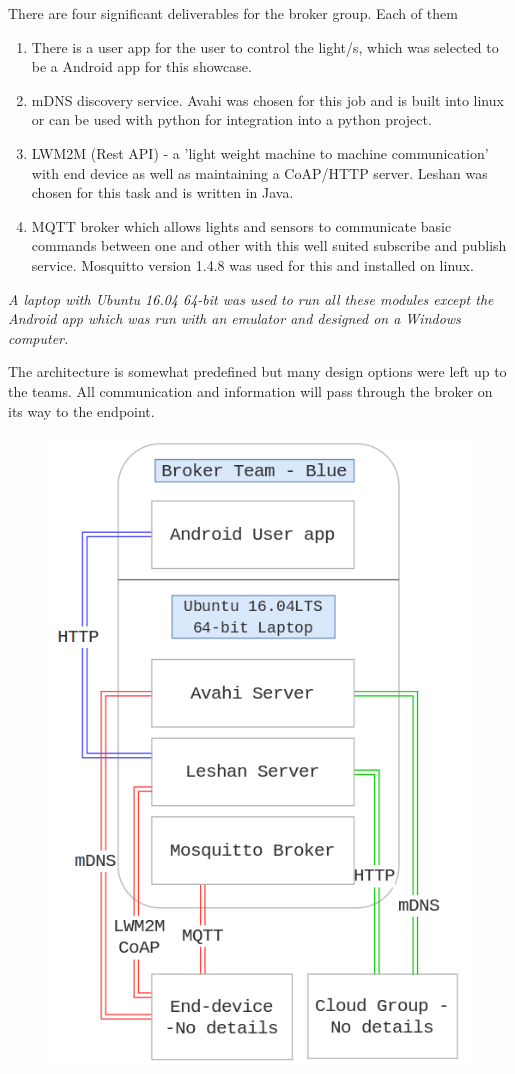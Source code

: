 \documentclass[11pt]{article}
\begin{document}
There are four significant deliverables for the broker group. Each of them 
\begin{enumerate}
	\item There is a user app for the user to control the light/s, which was selected to be a Android app for this showcase.
	\item mDNS discovery service. Avahi was chosen for this job and is built into linux or can be used with python for integration into a python project.
	\item LWM2M (Rest API) - a 'light weight machine to machine communication' with end device as well as maintaining a CoAP/HTTP server. Leshan was chosen for this task and is written in Java.
	\item MQTT broker which allows lights and sensors to communicate basic commands between one and other with this well suited subscribe and publish service. Mosquitto version 1.4.8 was used for this and installed on linux.
\end{enumerate}

\textit{A laptop with Ubuntu 16.04 64-bit was used to run all these modules except the Android app which was run with an emulator and designed on a Windows computer.}

The architecture is somewhat predefined but many design options were left up to the teams. All communication and information will pass through the broker on its way to the endpoint.

\begin{figure}[h]
	\begin{center}
		\includegraphics[width=0.6\linewidth]{img/overview}
		\caption{}
		\label{fig:fig2}
	\end{center}
\end{figure}
\end{document}
